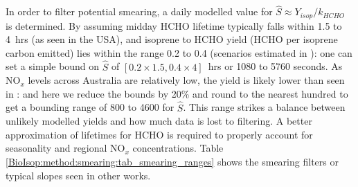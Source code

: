       In order to filter potential smearing, a daily modelled value for $\hat{S} \approx Y_{isop}/k_{HCHO}$ is determined.
      By assuming midday HCHO lifetime typically falls within 1.5 to 4~hrs (as seen in the USA), and isoprene to HCHO yield (HCHO per isoprene carbon emitted) lies within the range 0.2 to 0.4 (scenarios estimated in \textcite{Palmer2003}): one can set a simple bound on $\hat{S}$ of $[0.2 \times 1.5, 0.4 \times 4]$~hrs or 1080 to 5760 seconds.
      As NO$_x$ levels across Australia are relatively low, the yield is likely lower than seen in \textcite{Palmer2003}: and here we reduce the bounds by 20\% and round to the nearest hundred to get a bounding range of 800 to 4600 for $\hat{S}$. 
      This range strikes a balance between unlikely modelled yields and how much data is lost to filtering.
      A better approximation of lifetimes for HCHO is required to properly account for seasonality and regional NO$_x$ concentrations.
      Table \ref{BioIsop:method:smearing:tab_smearing_ranges} shows the smearing filters or typical slopes seen in other works.
      
